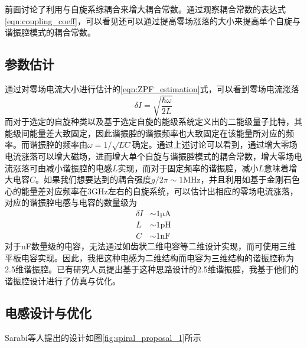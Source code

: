             前面讨论了利用与自旋系综耦合来增大耦合常数。通过观察耦合常数的表达式\ref{eqn:coupling_coeff}，可以看见还可以通过提高零场涨落的大小来提高单个自旋与谐振腔模式的耦合常数。


            \subsection{参数估计} %
            \label{sub:参数估计}

                通过对零场电流大小进行估计的\ref{eqn:ZPF_estimation}式，可以看到零场电流涨落
                \begin{equation}
                    \delta I = \sqrt{ \frac{\hbar \omega}{2 L} }
                \end{equation}
                而对于选定的自旋种类以及基于选定自旋的能级系统定义出的二能级量子比特，其能级间能量差大致固定，因此谐振腔的谐振频率也大致固定在该能量所对应的频率。而谐振腔的频率由$ \omega = 1/\sqrt{LC} $确定。通过上述讨论可以看到，通过增大零场电流涨落可以增大磁场，进而增大单个自旋与谐振腔模式的耦合常数，增大零场电流涨落可由减小谐振腔的电感$L$实现，而对于固定频率的谐振腔，减小$L$意味着增大电容$C$。如果我们想要达到的耦合强度$ g/2 \pi \sim 1 \mathrm{MHz} $，并且利用如基于金刚石色心的能量差对应频率在$3 \mathrm{GHz} $左右的自旋系统，可以估计出相应的零场电流涨落，对应的谐振腔电感与电容的数量级为
                \begin{align}
                    \delta I & \sim  1 \mathrm{\mu A}\\
                    L & \sim  1 \mathrm{pH}\\
                    C & \sim  1 \mathrm{nF}
                \end{align}
                对于nF数量级的电容，无法通过如齿状二维电容等二维设计实现，而可使用三维平板电容实现。因此，我把这种电感为二维结构而电容为三维结构的谐振腔称为2.5维谐振腔。已有研究人员提出基于这种思路设计的2.5维谐振腔\cite{sarabi2017prospective}，我基于他们的谐振腔设计进行了仿真与优化。
                

                
            \subsection{电感设计与优化} %
            \label{sub:电感设计与优化}

                Sarabi等人提出的设计如图\ref{fig:spiral_proposal_1}所示


